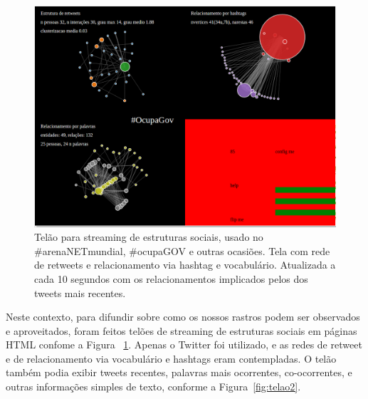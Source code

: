 \documentclass[a4paper, 11pt]{article} %
\begin{document}
\begin{figure}[h!]
  \centering
    \includegraphics[width=.7\textwidth]{telao1.png}
  \caption{\small Telão para streaming de estruturas sociais, usado no \#arenaNETmundial, \#ocupaGOV e outras ocasiões. Tela com rede de retweets e relacionamento via hashtag e vocabulário. Atualizada a cada 10 segundos com os relacionamentos implicados pelos dos tweets mais recentes.}\label{fig:telao1}
\end{figure}


Neste contexto, para difundir sobre como os nossos rastros podem ser observados e aproveitados, foram feitos telões de streaming de estruturas sociais em páginas HTML confome a Figura ~\ref{fig:telao1}. Apenas o Twitter foi utilizado, e as redes de retweet e de relacionamento via vocabulário e hashtags eram contempladas. O telão também podia exibir tweets recentes, palavras mais ocorrentes, co-ocorrentes, e outras informações simples de texto, conforme a Figura~\ref{fig:telao2}.



\end{document}
